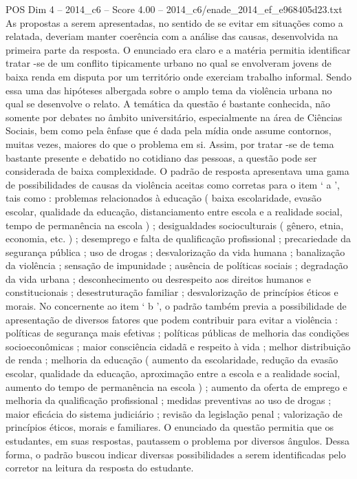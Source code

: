\begin{textsample}{POS Dim 4 – 2014\_c6 – Score 4.00 – 2014\_c6/enade\_2014\_ef\_e968405d23.txt}
As propostas a serem apresentadas, no sentido de se evitar em situações como a relatada, deveriam manter coerência com a análise das causas, desenvolvida na primeira parte da resposta.
O enunciado era claro e a matéria permitia identificar tratar -se de um conflito tipicamente urbano no qual se envolveram jovens de baixa renda em disputa por um território onde exerciam trabalho informal.
Sendo essa uma das hipóteses albergada sobre o amplo tema da violência urbana no qual se desenvolve o relato.
A temática da questão é bastante conhecida, não somente por debates no âmbito universitário, especialmente na área de Ciências Sociais, bem como pela ênfase que é dada pela mídia onde assume contornos, muitas vezes, maiores do que o problema em si.
Assim, por tratar -se de tema bastante presente e debatido no cotidiano das pessoas, a questão pode ser considerada de baixa complexidade.
O padrão de resposta apresentava uma gama de possibilidades de causas da violência aceitas como corretas para o item ‘ a ’, tais como : problemas relacionados à educação ( baixa escolaridade, evasão escolar, qualidade da educação, distanciamento entre escola e a realidade social, tempo de permanência na escola ) ; desigualdades socioculturais ( gênero, etnia, economia, etc. ) ; desemprego e falta de qualificação profissional ; precariedade da segurança pública ; uso de drogas ; desvalorização da vida humana ; banalização da violência ; sensação de impunidade ; ausência de políticas sociais ; degradação da vida urbana ; desconhecimento ou desrespeito aos direitos humanos e constitucionais ; desestruturação familiar ; desvalorização de princípios éticos e morais.
No concernente ao item ‘ b ’, o padrão também previa a possibilidade de apresentação de diversos fatores que podem contribuir para evitar a violência : políticas de segurança mais efetivas ; políticas públicas de melhoria das condições socioeconômicas ; maior consciência cidadã e respeito à vida ; melhor distribuição de renda ; melhoria da educação ( aumento da escolaridade, redução da evasão escolar, qualidade da educação, aproximação entre a escola e a realidade social, aumento do tempo de permanência na escola ) ; aumento da oferta de emprego e melhoria da qualificação profissional ; medidas preventivas ao uso de drogas ; maior eficácia do sistema judiciário ; revisão da legislação penal ; valorização de princípios éticos, morais e familiares.
O enunciado da questão permitia que os estudantes, em suas respostas, pautassem o problema por diversos ângulos.
Dessa forma, o padrão buscou indicar diversas possibilidades a serem identificadas pelo corretor na leitura da resposta do estudante.

\end{textsample}
